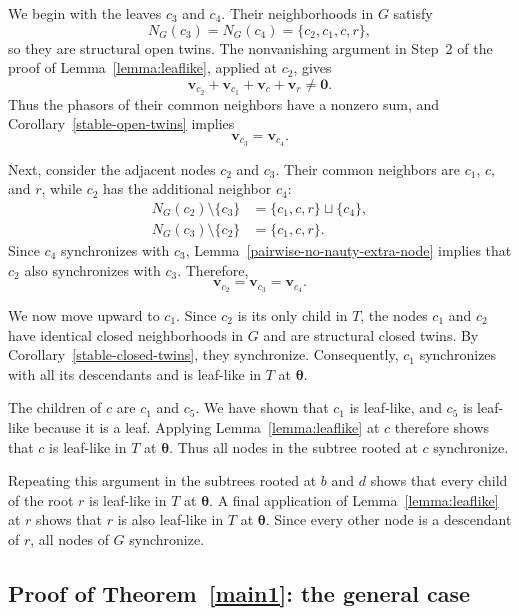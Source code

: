 \documentclass[11pt,reqno]{amsart}
\theoremstyle{definition}
\begin{document}
We begin with the leaves $c_3$ and $c_4$. Their neighborhoods
in $G$ satisfy
\[
    N_G(c_3)=N_G(c_4)=\{c_2,c_1,c,r\},
\]
so they are structural open twins.
The nonvanishing argument in Step~2 of the proof of
Lemma~\ref{lemma:leaflike}, applied at $c_2$, gives
\[
    \mathbf{v}_{c_2}+\mathbf{v}_{c_1}
    +\mathbf{v}_c+\mathbf{v}_r\neq\boldsymbol{0}.
\]
Thus the phasors of their common neighbors have a nonzero
sum, and Corollary~\ref{stable-open-twins} implies
\[
    \mathbf{v}_{c_3}=\mathbf{v}_{c_4}.
\]

Next, consider the adjacent nodes $c_2$ and $c_3$.
Their common neighbors are $c_1$, $c$, and $r$, while
$c_2$ has the additional neighbor $c_4$:
\[
\begin{aligned}
    N_G(c_2)\setminus\{c_3\}
    &=\{c_1,c,r\}\sqcup\{c_4\},\\
    N_G(c_3)\setminus\{c_2\}
    &=\{c_1,c,r\}.
\end{aligned}
\]
Since $c_4$ synchronizes with $c_3$,
Lemma~\ref{pairwise-no-nauty-extra-node} implies that
$c_2$ also synchronizes with $c_3$. Therefore,
\[
    \mathbf{v}_{c_2}
    =\mathbf{v}_{c_3}
    =\mathbf{v}_{c_4}.
\]

We now move upward to $c_1$. Since $c_2$ is its only child
in $T$, the nodes $c_1$ and $c_2$ have identical closed
neighborhoods in $G$ and are structural closed twins.
By Corollary~\ref{stable-closed-twins}, they synchronize.
Consequently, $c_1$ synchronizes with all its descendants
and is leaf-like in $T$ at $\boldsymbol{\theta}$.

The children of $c$ are $c_1$ and $c_5$.
We have shown that $c_1$ is leaf-like, and $c_5$ is
leaf-like because it is a leaf.
Applying Lemma~\ref{lemma:leaflike} at $c$ therefore shows
that $c$ is leaf-like in $T$ at $\boldsymbol{\theta}$.
Thus all nodes in the subtree rooted at $c$ synchronize.

Repeating this argument in the subtrees rooted at $b$ and
$d$ shows that every child of the root $r$ is leaf-like
in $T$ at $\boldsymbol{\theta}$.
A final application of Lemma~\ref{lemma:leaflike} at $r$
shows that $r$ is also leaf-like in $T$ at
$\boldsymbol{\theta}$.
Since every other node is a descendant of $r$, all nodes
of $G$ synchronize.

\subsection{Proof of Theorem~\ref{main1}: the general case}
\label{general-proof}
\end{document}
